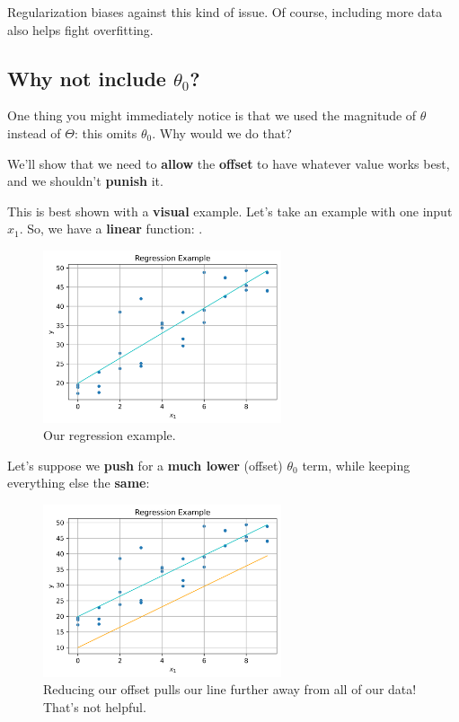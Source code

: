         Regularization biases against this kind of issue. Of course, including more data also helps fight overfitting.
        
         
    \subsection{Why not include $\theta_0$?}
    
        One thing you might immediately notice is that we used the magnitude of $\theta$ instead of $\Theta$: this omits $\theta_0$. Why would we do that?
        
        We'll show that we need to \textbf{allow} the \textbf{offset} to have whatever value works best, and we shouldn't \textbf{punish} it. 
        
        This is best shown with a \textbf{visual} example. Let's take an example with one input $x_1$. So, we have a \textbf{linear} function: .
        
        \begin{figure}[H]
        \centering
            \includegraphics[width=70mm,scale=0.5]{images/regression_images/Regression_Keep_Offset.png}
        
            \caption*{Our regression example.}
        \end{figure}
        
        Let's suppose we \textbf{push} for a \textbf{much lower} (offset) $\theta_0$ term, while keeping everything else the \textbf{same}:
        
        \begin{figure}[H]
        \centering
            \includegraphics[width=70mm,scale=0.5]{images/regression_images/Regression_Remove_Offset.png}
        
            \caption*{Reducing our offset pulls our line further away from all of our data! That's not helpful.}
        \end{figure}
        
